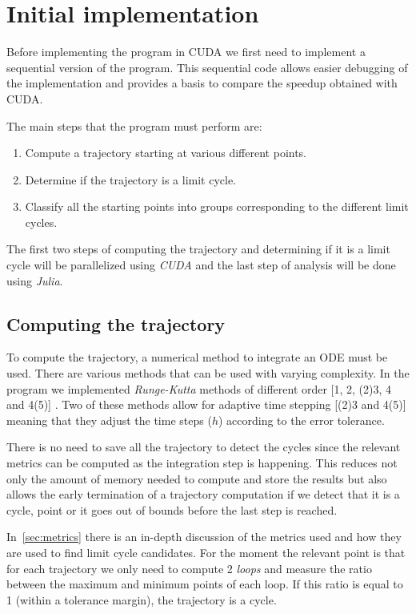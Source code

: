 \pagebreak
\section{Initial implementation}%
\label{sec:initial_implementation}

Before implementing the program in CUDA we first need to implement a sequential version of the program. This sequential code allows easier debugging of the implementation and provides a basis to compare the speedup obtained with CUDA.

The main steps that the program must perform are:

\begin{enumerate}
    \item Compute a trajectory starting at various different points.
    \item Determine if the trajectory is a limit cycle.
    \item Classify all the starting points into groups corresponding to
        the different limit cycles.
\end{enumerate}

The first two steps of computing the trajectory and determining if it is a limit cycle will be parallelized using \emph{CUDA} and the last step of analysis will be done using \emph{Julia}.

\subsection{Computing the trajectory}

To compute the trajectory, a numerical method to integrate an ODE must be used. There are various methods that can be used with varying complexity. In the program we implemented \emph{Runge-Kutta} methods of different order [1, 2, (2)3, 4 and 4(5)] \cite{butcher_numerical_2008}. Two of these methods allow for adaptive time stepping [(2)3 and 4(5)] meaning that they adjust the time steps ($h$) according to the error tolerance.

There is no need to save all the trajectory to detect the cycles since the relevant metrics can be computed as the integration step is happening. This reduces not only the amount of memory needed to compute and store the results but also allows the early termination of a trajectory computation if we detect that it is a cycle, point or it goes out of bounds before the last step is reached.

In~\cref{sec:metrics} there is an in-depth discussion of the metrics used and how they are used to find limit cycle candidates. For the moment the relevant point is that for each trajectory we only need to compute 2 \emph{loops} and measure the ratio between the maximum and minimum points of each loop. If this ratio is equal to 1 (within a tolerance margin), the trajectory is a cycle.

